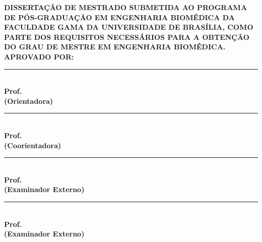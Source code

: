 \begin{folhadeaprovacao}
\begin{center}
    \vspace*{0in}
	{\textbf{\imprimirinstituicao}}
	\par
	{\textbf{\imprimirdepartamento}}

	\vspace{0.5 in}
	{\textbf{\large \imprimirtitulo}}
    	\vspace{0.25 in}
    	\par
         {\textbf{\large \imprimirautor}}
    	\vspace{0.25 in}
\end{center}
\textbf{DISSERTAÇÃO DE MESTRADO SUBMETIDA AO PROGRAMA DE PÓS-GRADUAÇÃO EM ENGENHARIA BIOMÉDICA DA FACULDADE GAMA DA
UNIVERSIDADE DE BRASÍLIA, COMO PARTE DOS REQUISITOS NECESSÁRIOS PARA A OBTENÇÃO DO GRAU DE MESTRE EM
ENGENHARIA BIOMÉDICA.}
\flushleft	
	\vspace{0.5 in}    
    \textbf{APROVADO POR:}\\
    \vspace{0.5 in}    
    \rule{10cm}{.1mm}\\
    {\textbf{Prof. \imprimirorientador} \\ \textbf{(Orientadora)} }\\
    \vspace{0.5 in}    
   \rule{10cm}{.1mm}\\ 
   {\textbf{Prof. \imprimirmembroCoorientador} \\ \textbf{(Coorientadora)}}\\
    \vspace{0.5 in}    
   \rule{10cm}{.1mm}\\
    {\textbf{Prof. \imprimirmembroconvidadoum} \\ \textbf{(Examinador Externo)}}\\
    \vspace{0.5 in}    
   \rule{10cm}{.1mm}\\
    {\textbf{Prof. \imprimirmembroconvidadodois} \\ \textbf{(Examinador Externo)}}\\
    
    \end{folhadeaprovacao}
